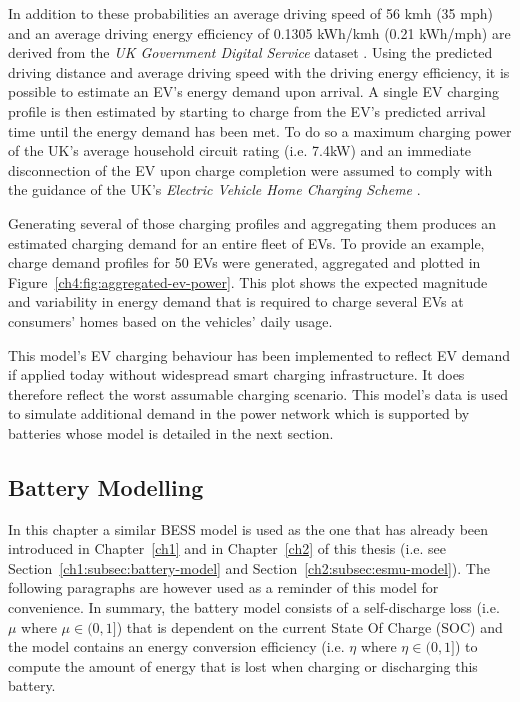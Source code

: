 


 
In addition to these probabilities an average driving speed of 56 kmh (35 mph) and an average driving energy efficiency of 0.1305 kWh/kmh (0.21 kWh/mph) are derived from the \textit{UK Government Digital Service} dataset \cite{UKGovernmentDigitalService2013}.
Using the predicted driving distance and average driving speed with the driving energy efficiency, it is possible to estimate an EV's energy demand upon arrival.
A single EV charging profile is then estimated by starting to charge from the EV's predicted arrival time until the energy demand has been met.
To do so a maximum charging power of the UK's average household circuit rating (i.e. 7.4kW) and an immediate disconnection of the EV upon charge completion were assumed to comply with the guidance of the UK's \textit{Electric Vehicle Home Charging Scheme} \cite{EVHomeCharging}.



Generating several of those charging profiles and aggregating them produces an estimated charging demand for an entire fleet of EVs.
To provide an example, charge demand profiles for 50 EVs were generated, aggregated and plotted in Figure~\ref{ch4:fig:aggregated-ev-power}.
This plot shows the expected magnitude and variability in energy demand that is required to charge several EVs at consumers' homes based on the vehicles' daily usage.

This model's EV charging behaviour has been implemented to reflect EV demand if applied today without widespread smart charging infrastructure.
It does therefore reflect the worst assumable charging scenario.
This model's data is used to simulate additional demand in the power network which is supported by batteries whose model is detailed in the next section.

\subsection{Battery Modelling}

In this chapter a similar BESS model is used as the one that has already been introduced in Chapter~\ref{ch1} and in Chapter~\ref{ch2} of this thesis (i.e. see Section~\ref{ch1:subsec:battery-model} and Section~\ref{ch2:subsec:esmu-model}).
The following paragraphs are however used as a reminder of this model for convenience.
In summary, the battery model consists of a self-discharge loss (i.e. $\mu$ where $\mu \in (0, 1]$) that is dependent on the current State Of Charge (SOC) and the model contains an energy conversion efficiency (i.e. $\eta$ where $\eta \in (0, 1]$) to compute the amount of energy that is lost when charging or discharging this battery.

